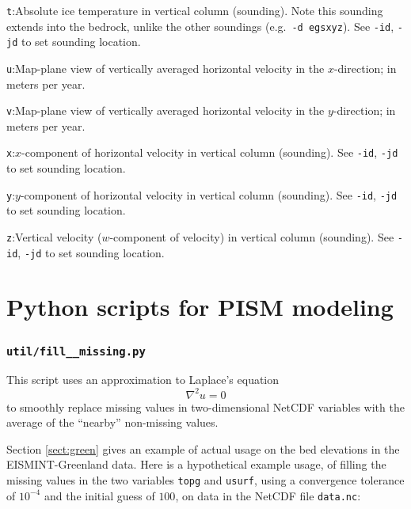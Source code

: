 \documentclass[11pt,final]{amsart}
\newcommand{\grad}{\nabla}
\newcommand{\und}{\_\!\_}
\begin{document}
\verb|t|:\quad Absolute ice temperature in vertical column (sounding).  Note this sounding extends into the bedrock, unlike the other soundings (e.g.~\verb|-d egsxyz|).  See \verb|-id|, \verb|-jd| to set sounding location.

\verb|u|:\quad Map-plane view of vertically averaged horizontal velocity in the $x$-direction;  in meters per year.

\verb|v|:\quad Map-plane view of vertically averaged horizontal velocity in the $y$-direction;  in meters per year.

\verb|x|:\quad $x$-component of horizontal velocity in vertical column (sounding).  See \verb|-id|, \verb|-jd| to set sounding location.

\verb|y|:\quad $y$-component of horizontal velocity in vertical column (sounding).  See \verb|-id|, \verb|-jd| to set sounding location.

\verb|z|:\quad Vertical velocity ($w$-component of velocity) in vertical column (sounding).  See \verb|-id|, \verb|-jd| to set sounding location.



\clearpage \newpage
\section{Python scripts for PISM modeling}\label{sect:scripts}

\newcommand{\scriptoptdef}[3]{\vspace{1mm}\noindent \large\texttt{-#1},\,\,\texttt{--#2=}\normalsize\,\,[\textsl{#3}]:\quad}

\newcommand{\scripthead}[1]{\subsubsection*{\Large{\texttt{#1}}}}

\newcommand{\opthead}{\smallskip \noindent\textsc{options}.\quad}

\scripthead{util/fill\und missing.py}\index{fill\und missing.py}  This script uses an approximation to Laplace's equation
	$$\grad^2 u = 0$$
to smoothly replace missing values in two-dimensional NetCDF variables with the average of the ``nearby'' non-missing values.

Section \ref{sect:green} gives an example of actual usage on the bed elevations in the EISMINT-Greenland data.  Here is a hypothetical example usage, of filling the missing values in the two variables \verb|topg| and \verb|usurf|, using a convergence tolerance of $10^{-4}$ and the initial guess of $100$, on data in the NetCDF file \verb|data.nc|:
\end{document}
